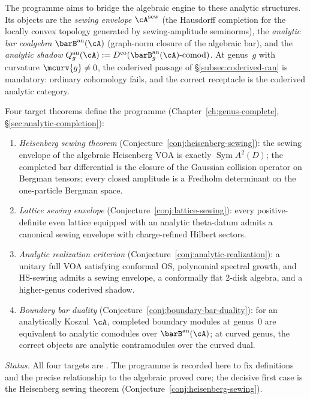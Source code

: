 The programme aims to bridge the algebraic engine to these analytic
structures.  Its objects are the \emph{sewing envelope}
$\cA^{\mathrm{sew}}$ (the Hausdorff completion for the locally convex
topology generated by sewing-amplitude seminorms), the \emph{analytic
bar coalgebra} $\barB^{\mathrm{an}}(\cA)$ (graph-norm closure of the
algebraic bar), and the \emph{analytic shadow}
$Q_g^{\mathrm{an}}(\cA) := D^{\mathrm{co}}(
\barB_g^{\mathrm{an}}(\cA)\text{-comod})$.  At genus~$g$ with
curvature $\mcurv{g} \neq 0$, the coderived passage of
\S\ref{subsec:coderived-ran} is mandatory: ordinary cohomology fails,
and the correct receptacle is the coderived analytic category.

Four target theorems define the programme
(Chapter~\ref{ch:genus-complete},
\S\ref{sec:analytic-completion}):

\begin{enumerate}[label=\textup{(\Alph*$_{\mathrm{an}}$)}]
\item \emph{Heisenberg sewing theorem}
  (Conjecture~\ref{conj:heisenberg-sewing}): the sewing envelope
  of the algebraic Heisenberg VOA is exactly
  $\operatorname{Sym} A^2(D)$; the completed bar differential is
  the closure of the Gaussian collision operator on Bergman tensors;
  every closed amplitude is a Fredholm determinant on the
  one-particle Bergman space.
\item \emph{Lattice sewing envelope}
  (Conjecture~\ref{conj:lattice-sewing}): every positive-definite
  even lattice equipped with an analytic theta-datum admits a
  canonical sewing envelope with charge-refined Hilbert sectors.
\item \emph{Analytic realization criterion}
  (Conjecture~\ref{conj:analytic-realization}): a unitary full VOA
  satisfying conformal OS, polynomial spectral growth, and
  HS-sewing admits a sewing envelope, a conformally flat 2-disk
  algebra, and a higher-genus coderived shadow.
\item \emph{Boundary bar duality}
  (Conjecture~\ref{conj:boundary-bar-duality}): for an
  analytically Koszul~$\cA$, completed boundary modules at
  genus~$0$ are equivalent to analytic comodules over
  $\barB^{\mathrm{an}}(\cA)$; at curved genus, the correct
  objects are analytic contramodules over the curved dual.
\end{enumerate}

\noindent
\emph{Status.}  All four targets are \ClaimStatusConjectured{}.
The programme is recorded here to fix definitions and the precise
relationship to the algebraic proved core; the decisive first case
is the Heisenberg sewing theorem
(Conjecture~\ref{conj:heisenberg-sewing}).

